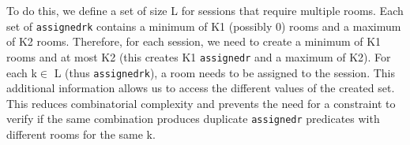 %
To do this, we define a set of size L for sessions that require multiple rooms. Each set of \verb|assignedrk| contains a minimum of K1 (possibly 0) rooms and a maximum of K2 rooms. Therefore, for each session, we need to create a minimum of K1 rooms and at most K2 (this creates K1 \verb|assignedr| and a maximum of K2). For each k$ \in$ L (thus \verb|assignedrk|), a room needs to be assigned to the session. This additional information allows us to access the different values of the created set. 
%
This reduces combinatorial complexity and prevents the need for a constraint to verify if the same combination produces duplicate \verb|assignedr| predicates with different rooms for the same k.